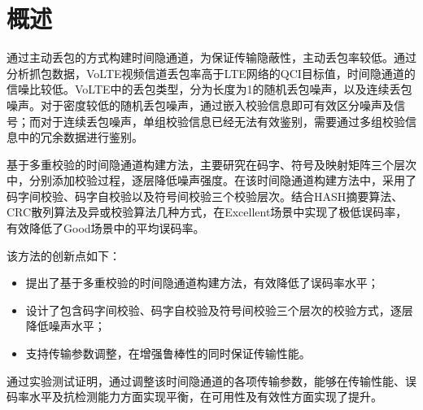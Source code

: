 \section{概述}
\label{chap:hash:overview}

通过主动丢包的方式构建时间隐通道，为保证传输隐蔽性，主动丢包率较低。通过分析抓包数据，VoLTE视频信道丢包率高于LTE网络的QCI目标值，时间隐通道的信噪比较低。VoLTE中的丢包类型，分为长度为1的随机丢包噪声，以及连续丢包噪声。对于密度较低的随机丢包噪声，通过嵌入校验信息即可有效区分噪声及信号；而对于连续丢包噪声，单组校验信息已经无法有效鉴别，需要通过多组校验信息中的冗余数据进行鉴别。

基于多重校验的时间隐通道构建方法，主要研究在码字、符号及映射矩阵三个层次中，分别添加校验过程，逐层降低噪声强度。在该时间隐通道构建方法中，采用了码字间校验、码字自校验以及符号间校验三个校验层次。结合HASH摘要算法、CRC散列算法及异或校验算法几种方式，在Excellent场景中实现了极低误码率，有效降低了Good场景中的平均误码率。

该方法的创新点如下：
\begin{itemize}
	\item 提出了基于多重校验的时间隐通道构建方法，有效降低了误码率水平；
	\item 设计了包含码字间校验、码字自校验及符号间校验三个层次的校验方式，逐层降低噪声水平；
	\item 支持传输参数调整，在增强鲁棒性的同时保证传输性能。
\end{itemize}

通过实验测试证明，通过调整该时间隐通道的各项传输参数，能够在传输性能、误码率水平及抗检测能力方面实现平衡，在可用性及有效性方面实现了提升。